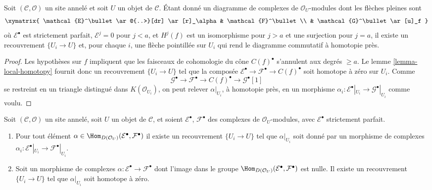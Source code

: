 \begin{lemma}
\label{lemma-lift-through-quasi-isomorphism}
Soit $(\mathcal{C}, \mathcal{O})$ un site annelé et soit $U$ un objet de
$\mathcal{C}$. Étant donné un diagramme de complexes de
$\mathcal{O}_U$-modules dont les flèches pleines sont
$$
\xymatrix{
\mathcal{E}^\bullet \ar@{..>}[dr] \ar[r]_\alpha & \mathcal{F}^\bullet \\
& \mathcal{G}^\bullet \ar[u]_f
}
$$
où $\mathcal{E}^\bullet$ est strictement parfait,
$\mathcal{E}^j = 0$ pour $j < a$, et $H^j(f)$ est un isomorphisme pour $j > a$
et une surjection pour $j = a$, il existe un recouvrement $\{U_i \to U\}$ et,
pour
chaque $i$, une flèche pointillée sur $U_i$ qui rend le diagramme commutatif à
homotopie près.
\end{lemma}

\begin{proof}
Les hypothèses sur $f$ impliquent que les faisceaux de cohomologie du cône
$C(f)^\bullet$ s'annulent aux degrés $\geq a$. Le lemme
\ref{lemma-local-homotopy} fournit donc un recouvrement $\{U_i \to U\}$ tel que
la composée
$\mathcal{E}^\bullet \to \mathcal{F}^\bullet \to C(f)^\bullet$
soit homotope à zéro sur $U_i$. Comme
$$
\mathcal{G}^\bullet \to \mathcal{F}^\bullet \to C(f)^\bullet \to
\mathcal{G}^\bullet[1]
$$
se restreint en un triangle distingué dans $K(\mathcal{O}_{U_i})$, on peut
relever $\alpha|_{U_i}$, à homotopie près, en un morphisme
$\alpha_i : \mathcal{E}^\bullet|_{U_i} \to \mathcal{G}^\bullet|_{U_i}$
comme voulu.
\end{proof}

\begin{lemma}
\label{lemma-local-actual}
Soit $(\mathcal{C}, \mathcal{O})$ un site annelé, soit $U$ un objet de
$\mathcal{C}$, et soient $\mathcal{E}^\bullet$, $\mathcal{F}^\bullet$ des
complexes de $\mathcal{O}_U$-modules, avec $\mathcal{E}^\bullet$ strictement
parfait.
\begin{enumerate}
\item Pour tout élément
$\alpha \in \Hom_{D(\mathcal{O}_U)}(\mathcal{E}^\bullet, \mathcal{F}^\bullet)$
il existe un recouvrement $\{U_i \to U\}$ tel que $\alpha|_{U_i}$ soit donné
par un morphisme de complexes
$\alpha_i : \mathcal{E}^\bullet|_{U_i} \to \mathcal{F}^\bullet|_{U_i}$.
\item Soit un morphisme de complexes
$\alpha : \mathcal{E}^\bullet \to \mathcal{F}^\bullet$ dont l'image dans le
groupe
$\Hom_{D(\mathcal{O}_U)}(\mathcal{E}^\bullet, \mathcal{F}^\bullet)$
est nulle. Il existe un recouvrement $\{U_i \to U\}$ tel que
$\alpha|_{U_i}$ soit homotope à zéro.
\end{enumerate}
\end{lemma}


